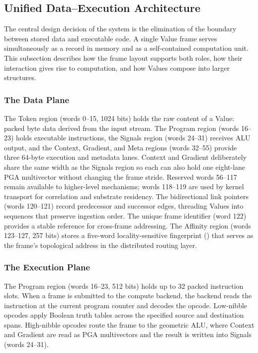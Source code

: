 \subsection{Unified Data--Execution Architecture}
\label{sec:value_architecture}

The central design decision of the system is the elimination of the
boundary between stored data and executable code.  A single Value frame
serves simultaneously as a record in memory and as a self-contained
computation unit.  This subsection describes how the frame layout
supports both roles, how their interaction gives rise to computation,
and how Values compose into larger structures.

\subsubsection{The Data Plane}

The Token region (words 0--15, 1024 bits) holds the raw content of a
Value: packed byte data derived from the input stream.  The Program
region (words 16--23) holds executable instructions, the Signals region
(words 24--31) receives ALU output, and the Context, Gradient, and Meta
regions (words 32--55) provide three 64-byte execution and metadata
lanes.  Context and Gradient deliberately share the same width as the
Signals region so each can also hold one eight-lane PGA multivector
without changing the frame stride.  Reserved words 56--117 remain
available to higher-level mechanisms; words 118--119 are used by kernel
transport for correlation and substrate residency.  The bidirectional
link pointers (words 120--121) record predecessor and successor edges,
threading Values into sequences that preserve ingestion order.  The
unique frame identifier (word 122) provides a stable reference for
cross-frame addressing.  The Affinity region (words 123--127, 257 bits)
stores a five-word locality-sensitive fingerprint
() that serves as the frame's topological
address in the distributed routing layer.

\subsubsection{The Execution Plane}

The Program region (words 16--23, 512 bits) holds up to 32 packed
instruction slots.  When a frame is submitted to the compute backend,
the backend reads the instruction at the current program counter and
decodes the opcode.  Low-nibble opcodes apply Boolean truth tables
across the specified source and destination spans.  High-nibble opcodes
route the frame to the geometric ALU, where Context and Gradient are
read as PGA multivectors and the result is written into Signals
(words 24--31).

